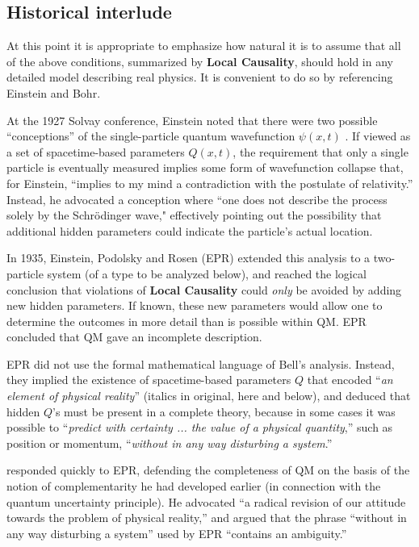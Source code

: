\documentclass[rmp, aps, preprint, longbibliography]{revtex4-1}
\begin{document}
\subsection{Historical interlude}
\label{sec:interlude}

At this point it is appropriate to emphasize how natural it is to assume that all of the above conditions, summarized by {\bf Local Causality}, should hold in any detailed model describing real physics.  It is convenient to do so by referencing Einstein and Bohr.

At the 1927 Solvay conference, Einstein noted that there were two possible ``conceptions'' of the single-particle quantum wavefunction $\psi(x,t)$ \cite{bacciagaluppi2009}. If viewed as a set of spacetime-based parameters $Q(x,t)$, the requirement that only a single particle is eventually measured implies some form of wavefunction collapse that, for Einstein, ``implies to my mind a contradiction with the postulate of relativity.''  Instead, he advocated a conception where ``one does not describe the process solely by the Schr\"odinger wave," effectively pointing out the possibility that additional hidden parameters could indicate the particle's actual location.

In 1935, Einstein, Podolsky and Rosen \nocite{EPR1935} (EPR) extended this analysis to a two-particle system (of a type to be analyzed below), and reached the logical conclusion that violations of {\bf Local Causality} could \emph{only} be avoided by adding new hidden parameters.  If known, these new parameters would allow one to determine the outcomes in more detail than is possible within QM\@.  EPR concluded that QM gave an incomplete description.

EPR did not use the formal mathematical language of Bell's analysis.  Instead, they implied the existence of spacetime-based parameters $Q$ that encoded ``{\it an element of physical reality}'' (italics in original, here and below), and deduced that hidden $Q$'s must be present in a complete theory, because in some cases it was possible to ``{\it predict with certainty ... the value of a physical quantity},'' such as position or momentum, ``{\it without in any way disturbing a system}.''  

\textcite{bohr1935} responded quickly to EPR, defending the completeness of QM on the basis of the notion of complementarity he had developed earlier (in connection with the quantum uncertainty principle).  He advocated ``a radical revision of our attitude towards the problem of physical reality,'' and argued that the phrase ``without in any way disturbing a system'' used by EPR ``contains an ambiguity.''   
\end{document}
